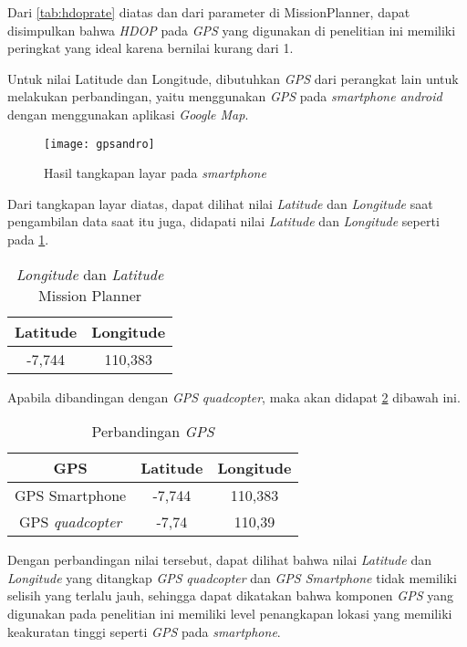 Dari \cref{tab:hdoprate} diatas dan dari parameter di MissionPlanner, dapat disimpulkan bahwa \textit{HDOP} pada \textit{GPS} yang digunakan di penelitian ini memiliki peringkat yang ideal karena bernilai kurang dari 1.

Untuk nilai Latitude dan Longitude, dibutuhkan \textit{GPS} dari perangkat lain untuk melakukan perbandingan, yaitu menggunakan \textit{GPS} pada \textit{smartphone android} dengan menggunakan aplikasi \textit{Google Map}.

\begin{figure}[H]
	\centering
	\texttt{[image: gpsandro]}
	\caption{Hasil tangkapan layar pada \textit{smartphone}}
	\label{fig:gpsandro}
\end{figure}

Dari tangkapan layar diatas, dapat dilihat nilai \textit{Latitude} dan \textit{Longitude} saat pengambilan data saat itu juga, didapati nilai \textit{Latitude} dan \textit{Longitude} seperti pada \cref{tab:longlat}.

\begin{table}[h]
	\caption{\textit{Longitude} dan \textit{Latitude} Mission Planner}
	\label{tab:longlat}
	\centering
	\begin{tabular}{|c|c|}
		\hline
		\textbf{Latitude} & \textbf{Longitude} \\ \hline
		-7,744   & 110,383   \\ \hline
	\end{tabular}
\end{table}

Apabila dibandingan dengan \textit{GPS} \textit{quadcopter}, maka akan didapat \cref{tab:gpscomparison} dibawah ini.

\begin{table}[h]
	\caption{Perbandingan \textit{GPS}}
	\label{tab:gpscomparison}
	\centering
	\begin{tabular}{|c|c|c|}
		\hline
		\textbf{GPS} & \textbf{Latitude} & \textbf{Longitude} \\ \hline
		GPS Smartphone & -7,744   & 110,383   \\ \hline
		GPS \textit{quadcopter} & -7,74    & 110,39    \\ \hline
	\end{tabular}
\end{table}

Dengan perbandingan nilai tersebut, dapat dilihat bahwa nilai \textit{Latitude} dan \textit{Longitude} yang ditangkap \textit{GPS} \textit{quadcopter} dan \textit{GPS Smartphone} tidak memiliki selisih yang terlalu jauh, sehingga dapat dikatakan bahwa komponen \textit{GPS} yang digunakan pada penelitian ini memiliki level penangkapan lokasi yang memiliki keakuratan tinggi seperti \textit{GPS} pada \textit{smartphone}.

